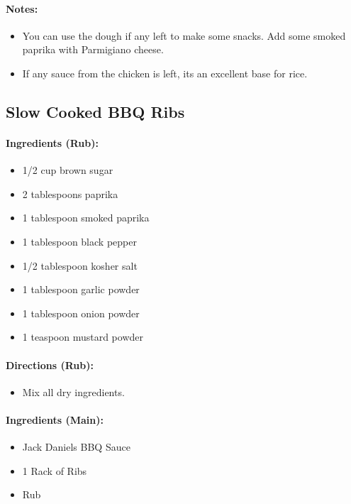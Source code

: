 \documentclass{article}
\begin{document}
\paragraph{Notes:}

\begin{itemize}
\item You can use the dough if any left to make some snacks. Add some smoked paprika with Parmigiano cheese.
\item If any sauce from the chicken is left, its an excellent base for rice.
\end{itemize}

\subsection{Slow Cooked BBQ Ribs}

\paragraph{Ingredients (Rub):}
\begin{itemize}
	\item 1/2 cup brown sugar
	\item 2 tablespoons paprika
	\item 1 tablespoon smoked paprika
	\item 1 tablespoon black pepper
	\item 1/2 tablespoon kosher salt
	\item 1 tablespoon garlic powder
	\item 1 tablespoon onion powder
	\item 1 teaspoon mustard powder
\end{itemize}

\paragraph{Directions (Rub):}
\begin{itemize}
	\item Mix all dry ingredients.
\end{itemize}

\paragraph{Ingredients (Main):}
\begin{itemize}
	\item Jack Daniels BBQ Sauce 
	\item 1 Rack of Ribs 
	\item Rub
\end{itemize}
\end{document}
